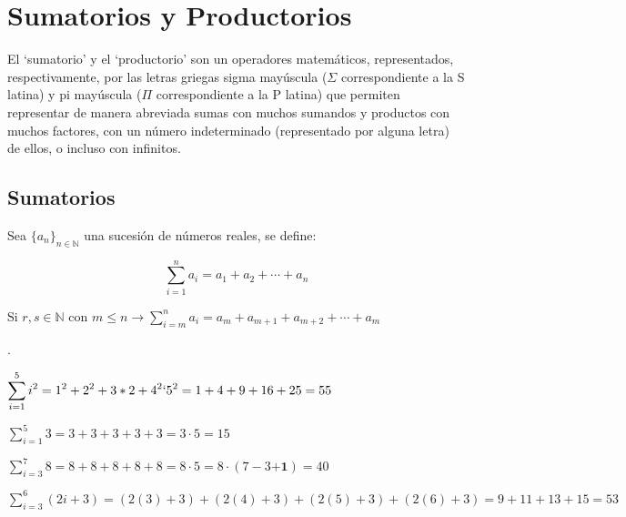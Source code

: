 \chapter{Sumatorios y Productorios} \label{sumatorioproductorio}

El `sumatorio' y el `productorio' son un operadores matemáticos, representados, respectivamente, por las letras griegas sigma mayúscula ($\Sigma$ correspondiente a la S latina) y pi mayúscula ($\Pi$ correspondiente a la P latina) que permiten representar de manera abreviada sumas con muchos sumandos y productos con muchos factores, con un número indeterminado (representado por alguna letra) de ellos, o incluso con infinitos. 

\section{Sumatorios}

\begin{defi}
Sea $\{a_n\}_{n\in \mathbb N}$	 una sucesión de números reales, se define:

\begin{equation*}
	\boxed{\; \sum_{i=1}^n a_i=a_1+a_2+ \cdots + a_n \; }
\end{equation*}

Si $r,s \in \mathbb N \text{ con } m\le n \to \displaystyle
\sum_{i=m}^n a_i= a_m + a_{m+1}+ a_{m+2}+ \cdots + a_m $

\end{defi}

\begin{ejem}.

	$\displaystyle \sum_{i=1}^5 i^2=1^2+2^2+3*2+4^2`5^2=1+4+9+16+25=55$
	
	$\displaystyle \sum_{i=1}^5 3=3+3+3+3+3=3\cdot 5 =15$
	
	$\displaystyle \sum_{i=3}^7 8=8+8+8+8+8=8\cdot 5=8\cdot (7-3\boldsymbol{+1})=40$
	
	$\displaystyle \sum_{i=3}^6 (2i+3)=(2(3)+3)+(2(4)+3)+(2(5)+3)+(2(6)+3)=9+11+13+15=53$
\end{ejem}

